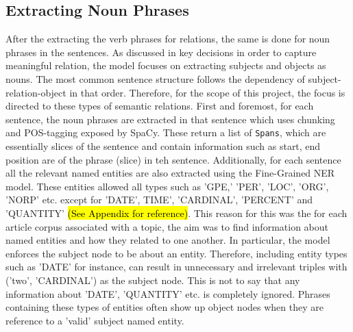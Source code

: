 
\subsection{Extracting Noun Phrases}

After the extracting the verb phrases for relations, the same is done for noun phrases in the sentences. As discussed in key decisions in order to capture meaningful relation, the model focuses on extracting subjects and objects as nouns. The most common sentence structure follows the dependency of subject-relation-object in that order. Therefore, for the scope of this project, the focus is directed to these types of semantic relations. First and foremost, for each sentence, the noun phrases are extracted in that sentence which uses chunking and POS-tagging exposed by SpaCy. These return a list of \texttt{Spans}, which are essentially slices of the sentence and contain information such as start, end position are of the phrase (slice) in teh sentence. Additionally, for each sentence all the relevant named entities are also extracted using the Fine-Grained NER model. These entities allowed all types such as 'GPE,' 'PER', 'LOC', 'ORG', 'NORP' etc. except for 'DATE', TIME', 'CARDINAL', 'PERCENT' and 'QUANTITY' \hl{(See Appendix for reference)}. This reason for this was the for each article corpus associated with a topic, the aim was to find information about named entities and how they related to one another. In particular, the model enforces the subject node to be about an entity. Therefore, including entity types such as 'DATE' for instance, can result in unnecessary and irrelevant triples with ('two', 'CARDINAL') as the subject node. This is not to say that any information about 'DATE', 'QUANTITY' etc. is completely ignored. Phrases containing these types of entities often show up object nodes when they are reference to a 'valid' subject named entity. 

